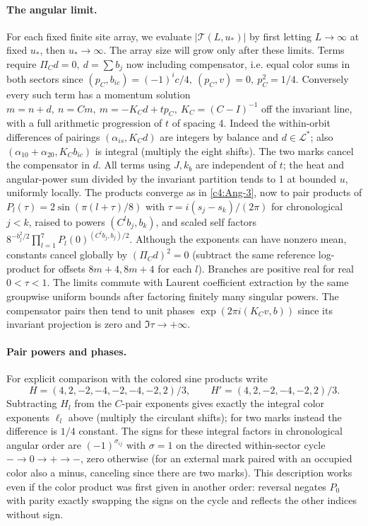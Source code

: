 \paragraph{The angular limit.} For each fixed finite site array, we evaluate \(|\mathcal T(L,u_*)|\) by first letting \(L\to\infty\) at fixed \(u_*\), then \(u_*\to\infty\). The array size will grow only after these limits. Terms require \(\Pi_C d=0,\ d=\sum b_j\) now including compensator, i.e. equal color sums in both sectors since \((p_C,b_{ic})=(-1)^i c/4,\ (p_C,v)=0,\ p_C^2=1/4\). Conversely every such term has a momentum solution \(m=n+d,\ n=Cm,\ m=-K_C d+t p_C,\ K_C=(C-I)^{-1}\) off the invariant line, with a full arithmetic progression of \(t\) of spacing 4. Indeed the within-orbit differences of pairings \((\alpha_{is},K_Cd)\) are integers by balance and \(d\in\mathcal L^*\); also \((\alpha_{10}+\alpha_{20},K_C b_{ic})\) is integral (multiply the eight shifts). The two marks cancel the compensator in \(d\). All terms using \(J,k_b\) are independent of \(t\); the heat and angular-power sum divided by the invariant partition tends to 1 at bounded \(u\), uniformly locally. The products converge as in \eqref{c4:Ang-3}, now to pair products of \(P_l(\tau)=2\sin(\pi(l+\tau)/8)\) with \(\tau=i(s_j-s_k)/(2\pi)\) for chronological \(j<k\), raised to powers \((C^l b_j,b_k)\), and scaled self factors \(8^{-b_j^2/2}\prod_{l=1}^7 P_l(0)^{(C^l b_j,b_j)/2}\). Although the exponents can have nonzero mean, constants cancel globally by \((\Pi_C d)^2=0\) (subtract the same reference log-product for offsets \(8m+4,8m+4\) for each \(l\)). Branches are positive real for real \(0<\tau<1\). The limits commute with Laurent coefficient extraction by the same groupwise uniform bounds after factoring finitely many singular powers. The compensator pairs then tend to unit phases \(\exp(2\pi i(K_Cv,b))\) since its invariant projection is zero and \(\Im\tau\to+\infty\).

\paragraph{Pair powers and phases.} For explicit comparison with the colored sine products write
\[
 H=(4,2,-2,-4,-2,-4,-2,2)/3,\qquad H'=(4,2,-2,-4,-2,2)/3 .
\]
Subtracting \(H_l\) from the \(C\)-pair exponents gives exactly the integral color exponents \(\ell_l\) above (multiply the circulant shifts); for two marks instead the difference is \(1/4\) constant. The signs for these integral factors in chronological angular order are \((-1)^{\sigma_{ij}}\) with \(\sigma=1\) on the directed within-sector cycle \(-\to0\to+\to-\), zero otherwise (for an external mark paired with an occupied color also a minus, canceling since there are two marks). This description works even if the color product was first given in another order: reversal negates \(P_0\) with parity exactly swapping the signs on the cycle and reflects the other indices without sign.

